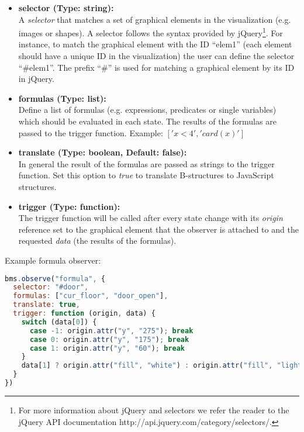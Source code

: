 \begin{itemize}

	\item[] \textbf{selector (Type: string):}\\ A \textit{selector} that matches a set of graphical elements in the visualization (e.g. images or shapes). 
A selector follows the syntax provided by jQuery\footnote{For more information about jQuery and selectors we refer the reader to the jQuery
API documentation http://api.jquery.com/category/selectors/.}. 
For instance, to match the graphical element with the ID ``elem1'' (each element should have a unique ID in the visualization) the user can define the selector ``\#elem1''.
The prefix ``\#'' is used for matching a graphical element by its ID in jQuery.

\item[] \textbf{formulas (Type: list):}\\
Define a list of formulas (e.g. expressions, predicates or single variables) which should be evaluated in each state.
The results of the formulas are passed to the trigger function.
Example: $['x < 4', 'card(x)']$

\item[] \textbf{translate (Type: boolean, Default: false):}\\
In general the result of the formulas are passed as strings to the trigger function.
Set this option to \textit{true} to translate B-structures to JavaScript structures.

\item[] \textbf{trigger (Type: function):}\\
The trigger function will be called after every state change with its \textit{origin} reference set to the graphical element that the observer is attached to and the requested \textit{data} (the results of the formulas).
 
\end{itemize}

Example formula observer:

\begin{lstlisting}[language=JavaScript]
bms.observe("formula", {
  selector: "#door",
  formulas: ["cur_floor", "door_open"],
  translate: true,
  trigger: function (origin, data) {
    switch (data[0]) {
      case -1: origin.attr("y", "275"); break
      case 0: origin.attr("y", "175"); break
      case 1: origin.attr("y", "60"); break
    }
    data[1] ? origin.attr("fill", "white") : origin.attr("fill", "lightgray")
  }
})
\end{lstlisting}

